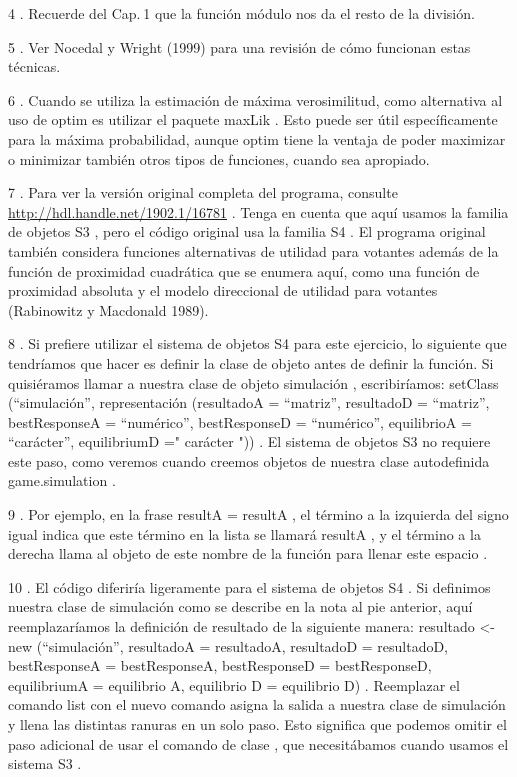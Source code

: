 \documentclass[
]{book}
\begin{document}
4 .
Recuerde del Cap. 1 que la función módulo nos da el resto de la división.

5 .
Ver Nocedal y Wright (1999) para una revisión de cómo funcionan estas técnicas.

6 .
Cuando se utiliza la estimación de máxima verosimilitud, como alternativa al uso de optim es utilizar el paquete maxLik . Esto puede ser útil específicamente para la máxima probabilidad, aunque optim tiene la ventaja de poder maximizar o minimizar también otros tipos de funciones, cuando sea apropiado.

7 .
Para ver la versión original completa del programa, consulte \url{http://hdl.handle.net/1902.1/16781} . Tenga en cuenta que aquí usamos la familia de objetos S3 , pero el código original usa la familia S4 . El programa original también considera funciones alternativas de utilidad para votantes además de la función de proximidad cuadrática que se enumera aquí, como una función de proximidad absoluta y el modelo direccional de utilidad para votantes (Rabinowitz y Macdonald 1989).

8 .
Si prefiere utilizar el sistema de objetos S4 para este ejercicio, lo siguiente que tendríamos que hacer es definir la clase de objeto antes de definir la función. Si quisiéramos llamar a nuestra clase de objeto simulación , escribiríamos: setClass (``simulación'', representación (resultadoA = ``matriz'', resultadoD = ``matriz'', bestResponseA = ``numérico'', bestResponseD = ``numérico'', equilibrioA = ``carácter'', equilibriumD =" carácter ")) . El sistema de objetos S3 no requiere este paso, como veremos cuando creemos objetos de nuestra clase autodefinida game.simulation .

9 .
Por ejemplo, en la frase resultA = resultA , el término a la izquierda del signo igual indica que este término en la lista se llamará resultA , y el término a la derecha llama al objeto de este nombre de la función para llenar este espacio .

10 .
El código diferiría ligeramente para el sistema de objetos S4 . Si definimos nuestra clase de simulación como se describe en la nota al pie anterior, aquí reemplazaríamos la definición de resultado de la siguiente manera: resultado \textless-new (``simulación'', resultadoA = resultadoA, resultadoD = resultadoD, bestResponseA = bestResponseA, bestResponseD = bestResponseD, equilibriumA = equilibrio A, equilibrio D = equilibrio D) . Reemplazar el comando list con el nuevo comando asigna la salida a nuestra clase de simulación y llena las distintas ranuras en un solo paso. Esto significa que podemos omitir el paso adicional de usar el comando de clase , que necesitábamos cuando usamos el sistema S3 .
\end{document}
